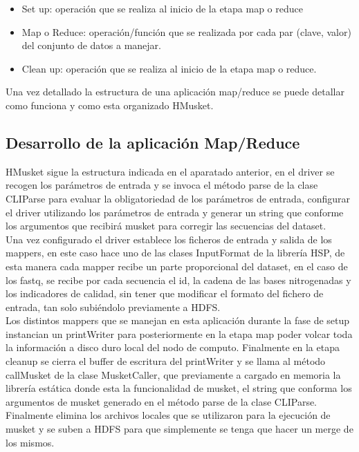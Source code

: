 \documentclass[conference]{IEEEtran}
\begin{document}
\begin{itemize}
	\item Set up: operación que se realiza al inicio de la etapa map o reduce
	\item Map o Reduce: operación/función que se realizada por cada par (clave, valor) del conjunto de datos a manejar.
	\item Clean up: operación que se realiza al inicio de la etapa map o reduce.
\end{itemize}

Una vez detallado la estructura de una aplicación map/reduce se puede detallar como funciona y como esta organizado HMusket.

\subsection{Desarrollo de la aplicación Map/Reduce}
HMusket sigue la estructura indicada en el aparatado anterior, en el driver se recogen los parámetros de entrada y se invoca el método parse de la clase CLIParse para evaluar la obligatoriedad de los parámetros de entrada, configurar el driver utilizando los parámetros de entrada y generar un string que conforme los argumentos que recibirá musket para corregir las secuencias del dataset.\\
Una vez configurado el driver establece los ficheros de entrada y salida de los mappers, en este caso hace uno de las clases InputFormat de la librería HSP, de esta manera cada mapper recibe un parte proporcional del dataset, en el caso de los fastq, se recibe por cada secuencia el id, la cadena de las bases nitrogenadas y los indicadores de calidad, sin tener que modificar el formato del fichero de entrada, tan solo subiéndolo previamente a HDFS.\\
Los distintos mappers que se manejan en esta aplicación durante la fase de setup instancian un printWriter para posteriormente en la etapa map poder volcar toda la información a disco duro local del nodo de computo. Finalmente en la etapa cleanup se cierra el buffer de escritura del printWriter y se llama al método callMusket de la clase MusketCaller, que previamente a cargado en memoria la librería estática donde esta la funcionalidad de musket, el string que conforma los argumentos de musket generado en el método parse de la clase CLIParse. Finalmente elimina los archivos locales que se utilizaron para la ejecución de musket y se suben a HDFS para que simplemente se tenga que hacer un merge de los mismos.
\end{document}
